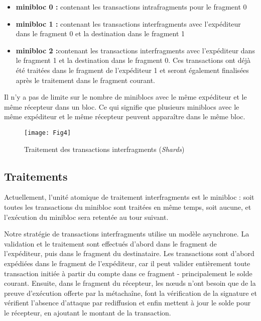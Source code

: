 \documentclass[journal]{IEEEtran}
\begin{document}
\begin{itemize}
  \item \textbf{minibloc 0 :} contenant les transactions intrafragments pour le fragment 0
  \item \textbf{minibloc 1 :} contenant les transactions interfragments avec l'expéditeur dans le fragment 0 et la destination dans le fragment 1
  \item \textbf{minibloc 2 :}contenant les transactions interfragments avec l'expéditeur dans le fragment 1 et la destination dans le fragment 0. Ces transactions ont déjà été traitées dans le fragment de l'expéditeur 1 et seront également finalisées après le traitement dans le fragment courant.
\end{itemize}

Il n'y a pas de limite sur le nombre de miniblocs avec le même expéditeur et le même récepteur dans un bloc. Ce qui signifie que plusieurs miniblocs avec le même expéditeur et le même récepteur peuvent apparaître dans le même bloc.

\begin{figure*}[h]
         \centering
	\texttt{[image: Fig4]} %
	\caption{Traitement des transactions interfragments (\textit{Shards})} %
	\label{Fig.4} %
\end{figure*}

\subsection{Traitements}
Actuellement, l'unité atomique de traitement interfragments est le minibloc : soit toutes les transactions du minibloc sont traitées en même temps, soit aucune, et l'exécution du minibloc sera retentée au tour suivant.

Notre stratégie de transactions interfragments utilise un modèle asynchrone. La validation et le traitement sont effectués d'abord dans le fragment de l'expéditeur, puis dans le fragment du destinataire. Les transactions sont d'abord expédiées dans le fragment de l'expéditeur, car il peut valider entièrement toute transaction initiée à partir du compte dans ce fragment - principalement le solde courant. Ensuite, dans le fragment du récepteur, les nœuds n'ont besoin que de la preuve d'exécution offerte par la métachaîne, font la vérification de la signature et vérifient l'absence d'attaque par rediffusion et enfin mettent à jour le solde pour le récepteur, en ajoutant le montant de la transaction.
\end{document}
